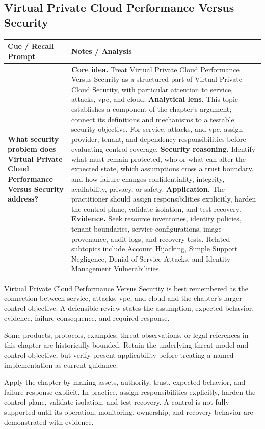 \documentclass[11pt]{article}
\newcommand{\CornellHeader}{%
\rowcolor{Navy}\color{white}\bfseries Cue / Recall Prompt & \color{white}\bfseries Notes / Analysis\\\hline}
\newcommand{\CornellRow}[2]{%
\cellcolor{CueGray}\RaggedRight\textbf{#1} & \RaggedRight #2\\\hline}
\begin{document}
\subsection*{Virtual Private Cloud Performance Versus Security}
\begin{longtable}{>{\RaggedRight\arraybackslash}p{}|>{\RaggedRight\arraybackslash}p{}}
\CornellHeader
\CornellRow{What security problem does Virtual Private Cloud Performance Versus Security address?}{\textbf{Core idea.} Treat Virtual Private Cloud Performance Versus Security as a structured part of Virtual Private Cloud Security, with particular attention to service, attacks, vpc, and cloud. \textbf{Analytical lens.} This topic establishes a component of the chapter's argument; connect its definitions and mechanisms to a testable security objective. For service, attacks, and vpc, assign provider, tenant, and dependency responsibilities before evaluating control coverage. \textbf{Security reasoning.} Identify what must remain protected, who or what can alter the expected state, which assumptions cross a trust boundary, and how failure changes confidentiality, integrity, availability, privacy, or safety. \textbf{Application.} The practitioner should assign responsibilities explicitly, harden the control plane, validate isolation, and test recovery. \textbf{Evidence.} Seek resource inventories, identity policies, tenant boundaries, service configurations, image provenance, audit logs, and recovery tests. Related subtopics include Account Hijacking, Simple Support Negligence, Denial of Service Attacks, and Identity Management Vulnerabilities.}
\end{longtable}
\begin{topicsummary}
Virtual Private Cloud Performance Versus Security is best remembered as the connection between service, attacks, vpc, and cloud and the chapter's larger control objective. A defensible review states the assumption, expected behavior, evidence, failure consequence, and required response.
\end{topicsummary}
\begin{historybox}
Some products, protocols, examples, threat observations, or legal references in this chapter are historically bounded. Retain the underlying threat model and control objective, but verify present applicability before treating a named implementation as current guidance.
\end{historybox}
\begin{defensebox}
Apply the chapter by making assets, authority, trust, expected behavior, and failure response explicit. In practice, assign responsibilities explicitly, harden the control plane, validate isolation, and test recovery. A control is not fully supported until its operation, monitoring, ownership, and recovery behavior are demonstrated with evidence.
\end{defensebox}
\end{document}
